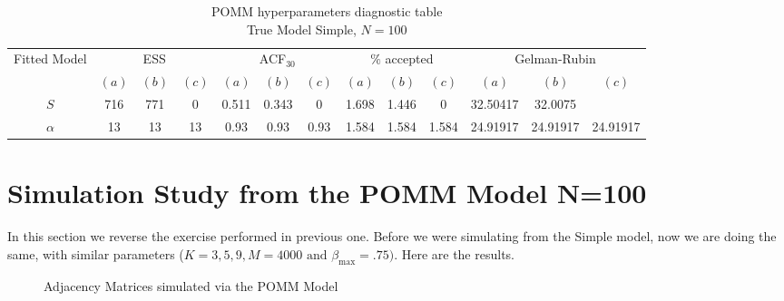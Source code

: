 \documentclass[11pt]{amsart}
\begin{document}
\begin{table}[h]
\centering
\caption*{
{\large POMM hyperparameters diagnostic table} \\ 
{\small True Model Simple, $N=100$}
} 
\begin{tabular}{ccccccccccccc}
\toprule
\multirow{2}{*}{Fitted Model} & \multicolumn{3}{c}{ESS} & \multicolumn{3}{c}{
ACF$_{30}$} & \multicolumn{3}{c}{$\%$ accepted} & \multicolumn{3}{c}{Gelman-Rubin}\\
\cmidrule(lr){2-4} \cmidrule(lr){5-7} \cmidrule(lr){8-10} \cmidrule(lr){11-13} 
& $(a)$ & $(b)$ & $(c)$ & $(a)$ & $(b)$ & $(c)$ & $(a)$ & $(b)$ & $(c)$ & $(a)$ & $(b)$ & $(c)$ \\
\midrule
$S$ &716 & 771 & 0 & 0.511 & 0.343 & 0 & 1.698 & 1.446 & 0 & 32.50417 & 32.0075  \\
$\alpha$ &13 & 13 & 13 & 0.93 & 0.93 & 0.93 & 1.584 & 1.584 & 1.584 & 24.91917 & 24.91917 & 24.91917 \\
\bottomrule
\end{tabular}
\label{table:simulations_from_simple}
\end{table}

\clearpage


\section{Simulation Study from the POMM Model N=100}

In this section we reverse the exercise performed in previous one. Before we were simulating from the Simple model, now we are doing the same, with similar parameters ($K=3,5,9, M=4000 \text{ and } \beta_{\max} = .75)$. Here are the results.

\begin{figure}[h]
    \centering
    \hfill
    \hfill
    \caption{Adjacency Matrices simulated via the POMM Model}
    \label{fig:all_images}
\end{figure}
\end{document}
